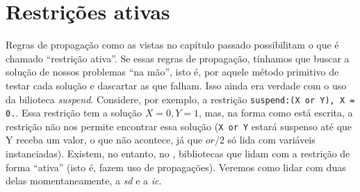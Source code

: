 \documentclass{article}
\begin{document}
\section{Restrições ativas}

Regras de propagação como as vistas no capítulo passado possibilitam o que é chamado ``restrição ativa''. Se essas regras de
propagação, tínhamos que buscar a solução de nossos problemas ``na mão'', isto é, por aquele método primitivo de testar cada
solução e dascartar as que falham. Isso ainda era verdade com o uso da bilioteca \textit{suspend}. Considere, por exemplo, a restrição {\tt suspend:(X or Y), X = 0.}. Essa restrição tem a solução ${X=0,Y=1}$, mas, na forma como está escrita, a restrição
não nos permite encontrar essa solução ({\tt X or Y} estará suspenso até que Y receba um valor, o que não acontece, já que $or/2$
só lida com variáveis instanciadas). Existem, no entanto, no \eclipse, bibliotecas que lidam com a restrição de forma ``ativa''
(isto é, fazem uso de propagações). Veremos como lidar com duas delas momentaneamente, a {\it sd} e a {\it ic}.
\end{document}
